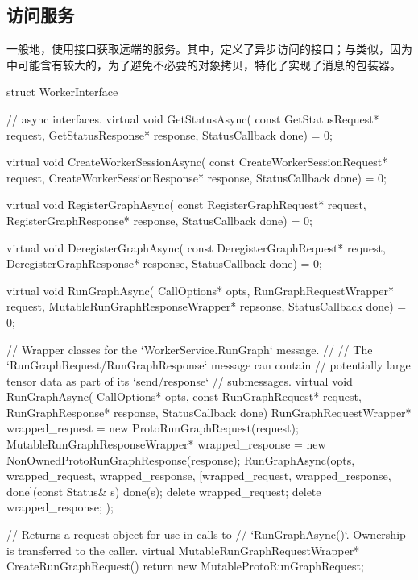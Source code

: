 \begin{content}
\subsection{访问服务}

一般地，使用接口获取远端的服务。其中，定义了异步访问的接口；与类似，因为中可能含有较大的，为了避免不必要的对象拷贝，特化了实现了消息的包装器。

\begin{leftbar}
\begin{c++}
struct WorkerInterface {
  // async interfaces.
  virtual void GetStatusAsync(
      const GetStatusRequest* request,
      GetStatusResponse* response,
      StatusCallback done) = 0;

  virtual void CreateWorkerSessionAsync(
      const CreateWorkerSessionRequest* request,
      CreateWorkerSessionResponse* response, 
      StatusCallback done) = 0;

  virtual void RegisterGraphAsync(
      const RegisterGraphRequest* request,
      RegisterGraphResponse* response,
      StatusCallback done) = 0;

  virtual void DeregisterGraphAsync(
      const DeregisterGraphRequest* request,
      DeregisterGraphResponse* response,
      StatusCallback done) = 0;

  virtual void RunGraphAsync(
      CallOptions* opts, 
      RunGraphRequestWrapper* request,
      MutableRunGraphResponseWrapper* repsonse,
      StatusCallback done) = 0;

  // Wrapper classes for the `WorkerService.RunGraph` message.
  //
  // The `RunGraphRequest/RunGraphResponse` message can contain 
  // potentially large tensor data as part of its `send/response`
  // submessages.
  virtual void RunGraphAsync(
      CallOptions* opts, 
      const RunGraphRequest* request,
      RunGraphResponse* response, 
      StatusCallback done) {
    RunGraphRequestWrapper* wrapped_request = 
        new ProtoRunGraphRequest(request);
    MutableRunGraphResponseWrapper* wrapped_response =
        new NonOwnedProtoRunGraphResponse(response);
    RunGraphAsync(opts, wrapped_request, wrapped_response,
        [wrapped_request, wrapped_response, done](const Status& s) {
            done(s);
            delete wrapped_request;
            delete wrapped_response;
        });
  }

  // Returns a request object for use in calls to
  // `RunGraphAsync()`. Ownership is transferred to the caller.
  virtual MutableRunGraphRequestWrapper* CreateRunGraphRequest() {
    return new MutableProtoRunGraphRequest;
  }

}
\end{c++}
\end{leftbar}
\end{content}

